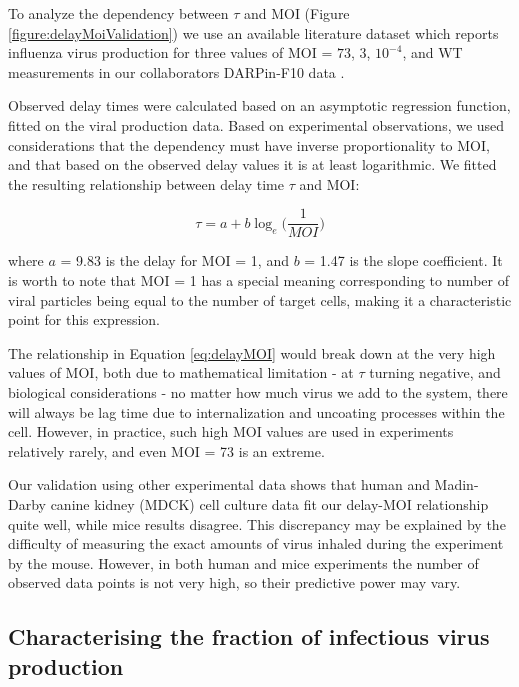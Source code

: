 To analyze the dependency between $\tau$ and MOI (Figure \ref{figure:delayMoiValidation}) we use an available literature dataset \cite{frensing2016influenza, rudiger2019multiscale} which reports influenza virus production for three values of MOI = $73$, $3$, $10^{-4}$, and WT measurements in our collaborators DARPin-F10 data \cite{DarpinData}.

Observed delay times were calculated based on an asymptotic regression function, fitted on the viral production data. Based on experimental observations, we used considerations that the dependency must have inverse proportionality to MOI, and that based on the observed delay values it is at least logarithmic. We fitted the resulting relationship between delay time $\tau$ and MOI:

\begin{equation}
\tau = a + b \log_e \Big(\frac{1}{MOI}\Big)
\label{eq:delayMOI}
\end{equation}

where $a$ = 9.83 is the delay for MOI = 1, and $b$ = 1.47 is the slope coefficient. It is worth to note that MOI = 1 has a special meaning corresponding to number of viral particles being equal to the number of target cells, making it a characteristic point for this expression.

The relationship in Equation \ref{eq:delayMOI} would break down at the very high values of MOI, both due to mathematical limitation - at $\tau$ turning negative, and biological considerations - no matter how much virus we add to the system, there will always be lag time due to internalization and uncoating processes within the cell. However, in practice, such high MOI values are used in experiments relatively rarely, and even MOI = 73 is an extreme.

Our validation using other experimental data shows that human and Madin-Darby canine kidney (MDCK) cell culture data fit our delay-MOI relationship quite well, while mice results disagree. This discrepancy may be explained by the difficulty of measuring the exact amounts of virus inhaled during the experiment by the mouse. However, in both human and mice experiments the number of observed data points is not very high, so their predictive power may vary.

\subsection{Characterising the fraction of infectious virus production}

